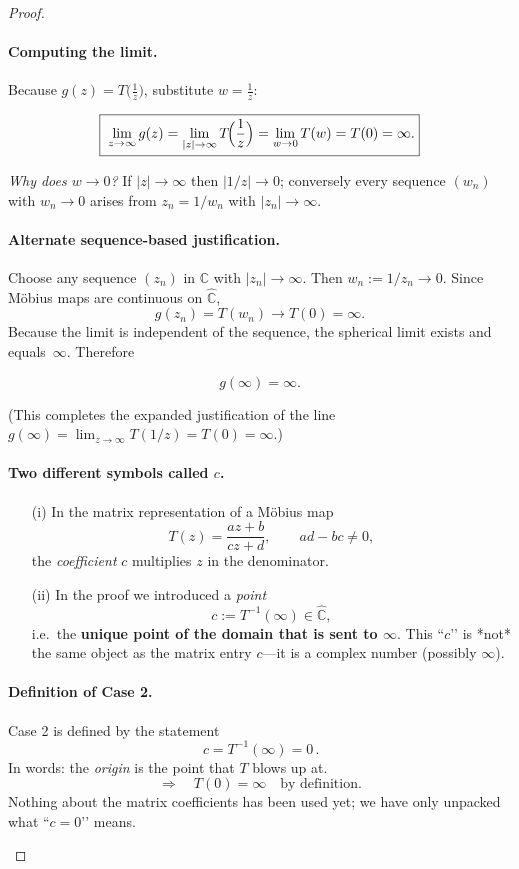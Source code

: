 \documentclass[12pt]{article}
\theoremstyle{definition} %
\theoremstyle{plain} %
\begin{document}
\begin{proof}
\begin{enumerate}
\paragraph{Computing the limit.}
Because \(g(z)=T\!\bigl(\frac1z\bigr)\), substitute \(w=\frac1z\):

\[
  \boxed{\;
  \displaystyle
   \lim_{z\to\infty}g(z)
     =\lim_{|z|\to\infty}T\!\Bigl(\frac1z\Bigr)
     =\lim_{w\to 0}T(w)
     =T(0)
     =\infty.
  }
\]

\emph{Why does \(w\to0\)?}  
If \(|z|\to\infty\) then \(|1/z|\to0\); conversely every sequence
\((w_n)\) with \(w_n\to0\) arises from \(z_n=1/w_n\) with
\(|z_n|\to\infty\).

\paragraph{Alternate sequence-based justification.}
Choose any sequence \((z_n)\) in \(\mathbb{{C}}\) with \(|z_n|\to\infty\).
Then \(w_n:=1/z_n\to0\).  Since Möbius maps are continuous on
\(\widehat{\mathbb{{C}}}\),
\[
   g(z_n)=T(w_n)\longrightarrow T(0)=\infty.
\]
Because the limit is independent of the sequence, the spherical limit
exists and equals~\(\infty\).  Therefore

\[
   g(\infty)=\infty.
\]

\bigskip
(This completes the expanded justification of the line
\(\displaystyle g(\infty)=\lim_{z\to\infty}T(1/z)=T(0)=\infty\).)
\paragraph{Two different symbols called $c$.}
\begin{itemize}
\item[(i)]  In the matrix representation of a Möbius map  
  \[
     T(z)=\frac{az+b}{cz+d},\qquad ad-bc\neq0,
  \]
  the \emph{coefficient} $c$ multiplies $z$ in the denominator.
\item[(ii)]  In the proof we introduced a \emph{point}
  \[
        c:=T^{-1}(\infty)\in\widehat{\mathbb{{C}}},
  \]
  i.e.\ the \textbf{unique point of the domain that is sent to $\infty$}.  
  This “$c$’’ is *not* the same object as the matrix entry $c$—it is a
  complex number (possibly $\infty$).
\end{itemize}

\paragraph{Definition of Case 2.}
Case 2 is defined by the statement  
\[
   \boxed{\,c = T^{-1}(\infty)=0\,}.
\]
In words: the \emph{origin} is the point that $T$ blows up at.
\[
   \Longrightarrow\quad
   T(0)=\infty
   \quad\text{by definition.}
\]
Nothing about the matrix coefficients has been used yet; we have only
unpacked what “$c=0$’’ means.


\end{enumerate}
\end{proof}
\end{document}
